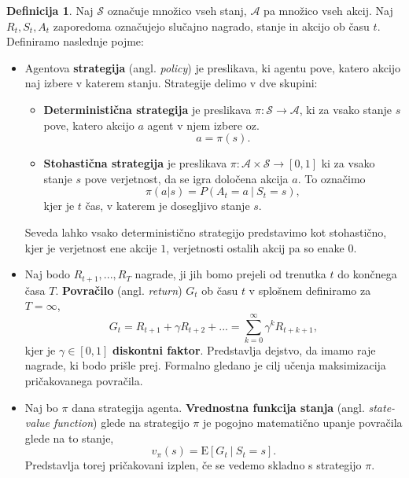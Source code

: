\documentclass[12pt,a4paper]{amsart}
\theoremstyle{definition} %
\newtheorem{definicija}{Definicija}[section]
\theoremstyle{plain} %
\begin{document}
\begin{definicija}
    Naj $\mathcal{S}$ označuje množico vseh stanj, $\mathcal{A}$ pa množico vseh akcij. Naj $R_t,
    S_t, A_t$ zaporedoma označujejo slučajno nagrado, stanje in akcijo ob času $t$. Definiramo naslednje 
    pojme: 
    \begin{itemize}
        \item   Agentova \textbf{strategija} (angl. \textit{policy}) je preslikava, ki agentu pove, 
                katero akcijo naj izbere v katerem stanju. Strategije delimo v dve skupini:
                \begin{itemize}
                    \item \textbf{Deterministična strategija} je preslikava $\pi: \mathcal{S} 
                    \rightarrow \mathcal{A}$, ki za vsako stanje $s$ pove, katero akcijo $a$ agent v njem 
                    izbere oz.
                    $$
                    a = \pi(s).
                    $$
                    \item \textbf{Stohastična strategija} je preslikava $\pi: \mathcal{A} \times 
                    \mathcal{S} \rightarrow [0, 1]$ ki za vsako stanje $s$ pove verjetnost, da se igra 
                    določena akcija $a$. To označimo 
                    $$
                    \pi(a | s) = P(A_t = a~|~S_t = s),
                    $$
                    kjer je $t$ čas, v katerem je dosegljivo stanje $s$.
                \end{itemize}
                Seveda lahko vsako deterministično strategijo predstavimo kot stohastično, kjer je 
                verjetnost ene akcije $1$, verjetnosti ostalih akcij pa so enake $0$.
        
        \item Naj bodo $R_{t+1}, ...,R_T$ nagrade, ji jih bomo prejeli od trenutka 
                $t$ do končnega časa $T$. \textbf{Povračilo} (angl. \textit{return}) $G_t$ ob času $t$ 
                v splošnem definiramo za $T=\infty$,
                $$
                G_t = R_{t+1} + \gamma R_{t+2} + ... = \sum_{k=0}^\infty \gamma^k R_{t + k + 1} ,
                $$
                kjer je $\gamma \in [0,1]$ \textbf{diskontni faktor}. Predstavlja dejstvo, da 
                imamo raje nagrade, ki bodo prišle prej. Formalno gledano je cilj učenja 
                maksimizacija pričakovanega povračila.

         \item Naj bo $\pi$ dana strategija agenta. \textbf{Vrednostna funkcija 
                stanja} (angl. \textit{state-value function}) glede na strategijo $\pi$ je 
                pogojno matematično upanje povračila glede na to stanje, 
                \begin{equation}\label{vfs}
                v_\pi(s) = \mathrm{E} [G_t~|~S_t = s].
                \end{equation}
                Predstavlja torej pričakovani izplen, če se vedemo skladno s strategijo $\pi$.


\end{itemize}
\end{definicija}
\end{document}
